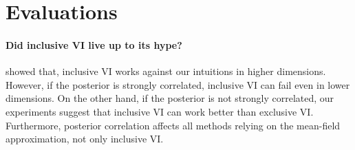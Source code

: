 
\section{Evaluations}\label{section:eval}


\paragraph{Did inclusive VI live up to its hype?}
\citet{dhaka_challenges_2021} showed that, inclusive VI works against our intuitions in higher dimensions.
However, if the posterior is strongly correlated, inclusive VI can fail even in lower dimensions.
On the other hand, if the posterior is not strongly correlated, our experiments suggest that inclusive VI can work better than exclusive VI.
Furthermore, posterior correlation affects all methods relying on the mean-field approximation, not only inclusive VI.


